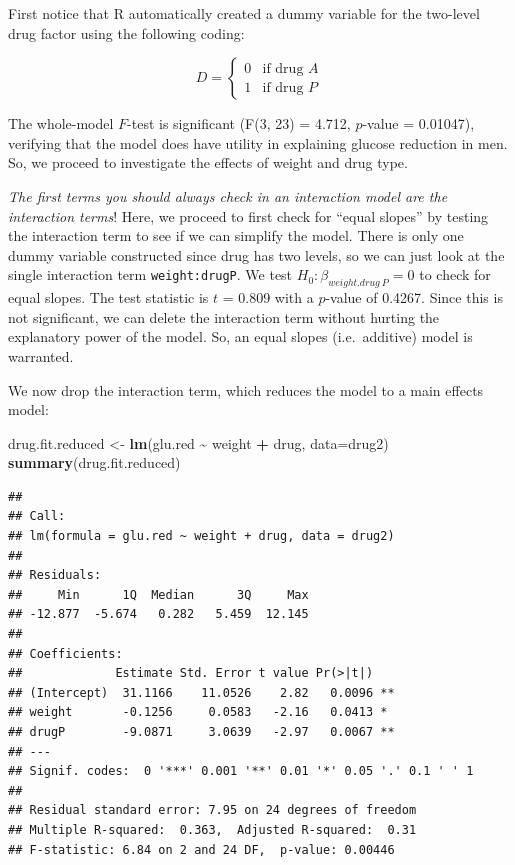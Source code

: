 \documentclass[
]{book}
\newenvironment{Shaded}{\begin{snugshade}}{\end{snugshade}}
\newcommand{\AttributeTok}[1]{\textcolor[rgb]{0.13,0.29,0.53}{#1}}
\newcommand{\FunctionTok}[1]{\textcolor[rgb]{0.13,0.29,0.53}{\textbf{#1}}}
\newcommand{\NormalTok}[1]{#1}
\newcommand{\OtherTok}[1]{\textcolor[rgb]{0.56,0.35,0.01}{#1}}
\newcommand{\SpecialCharTok}[1]{\textcolor[rgb]{0.81,0.36,0.00}{\textbf{#1}}}
\begin{document}
First notice that R automatically created a dummy variable for the two-level drug factor using the following coding:

\[D = \left\{\begin{array}{ll} 0 & \textrm{if drug } A \\ 1 & \textrm{if drug } P \end{array}\right.\]

The whole-model \(F\)-test is significant (F(3, 23) = 4.712, \(p\)-value = 0.01047), verifying that the model does have utility in explaining glucose reduction in men. So, we proceed to investigate the effects of weight and drug type.

\emph{The first terms you should always check in an interaction model are the interaction terms}! Here, we proceed to first check for ``equal slopes'' by testing the interaction term to see if we can simplify the model. There is only one dummy variable constructed since drug has two levels, so we can just look at the single interaction term \texttt{weight:drugP}. We test \(H_0: \beta_{weight.drug~P} = 0\) to check for equal slopes. The test statistic is \(t\) = 0.809 with a \(p\)-value of 0.4267. Since this is not significant, we can delete the interaction term without hurting the explanatory power of the model. So, an equal slopes (i.e.~additive) model is warranted.

We now drop the interaction term, which reduces the model to a main effects model:

\begin{Shaded}
\begin{Highlighting}[]
\NormalTok{drug.fit.reduced }\OtherTok{\textless{}{-}} \FunctionTok{lm}\NormalTok{(glu.red }\SpecialCharTok{\textasciitilde{}}\NormalTok{ weight }\SpecialCharTok{+}\NormalTok{ drug, }\AttributeTok{data=}\NormalTok{drug2)}
\FunctionTok{summary}\NormalTok{(drug.fit.reduced)}
\end{Highlighting}
\end{Shaded}

\begin{verbatim}
## 
## Call:
## lm(formula = glu.red ~ weight + drug, data = drug2)
## 
## Residuals:
##     Min      1Q  Median      3Q     Max 
## -12.877  -5.674   0.282   5.459  12.145 
## 
## Coefficients:
##             Estimate Std. Error t value Pr(>|t|)   
## (Intercept)  31.1166    11.0526    2.82   0.0096 **
## weight       -0.1256     0.0583   -2.16   0.0413 * 
## drugP        -9.0871     3.0639   -2.97   0.0067 **
## ---
## Signif. codes:  0 '***' 0.001 '**' 0.01 '*' 0.05 '.' 0.1 ' ' 1
## 
## Residual standard error: 7.95 on 24 degrees of freedom
## Multiple R-squared:  0.363,  Adjusted R-squared:  0.31 
## F-statistic: 6.84 on 2 and 24 DF,  p-value: 0.00446
\end{verbatim}
\end{document}
